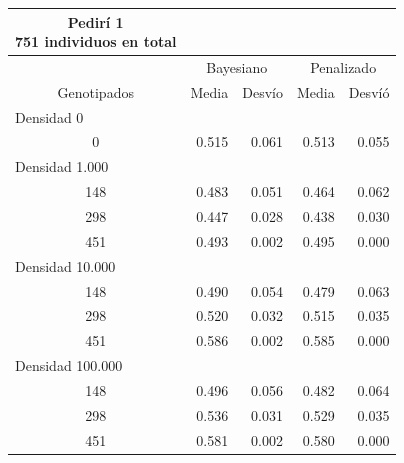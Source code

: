 \documentclass[11pt,spanish,a4paper,oneside,]{book} %
\begin{document}
\captionsetup[table]{labelformat=empty,skip=1pt}
\begin{longtable}{crrrr}
\caption*{
{\large Pedirí 1} \\ 
{\small 751 individuos en total}
} \\ 
\toprule
 & \multicolumn{2}{c}{Bayesiano} & \multicolumn{2}{c}{Penalizado} \\ 
 \cmidrule(lr){2-3} \cmidrule(lr){4-5}
Genotipados & Media & Desvío & Media & Desvíó \\ 
\midrule
\multicolumn{1}{l}{Densidad 0} \\ 
\midrule
0 & 0.515 & 0.061 & 0.513 & 0.055 \\ 
\midrule
\multicolumn{1}{l}{Densidad 1.000} \\ 
\midrule
148 & 0.483 & 0.051 & 0.464 & 0.062 \\ 
298 & 0.447 & 0.028 & 0.438 & 0.030 \\ 
451 & 0.493 & 0.002 & 0.495 & 0.000 \\ 
\midrule
\multicolumn{1}{l}{Densidad 10.000} \\ 
\midrule
148 & 0.490 & 0.054 & 0.479 & 0.063 \\ 
298 & 0.520 & 0.032 & 0.515 & 0.035 \\ 
451 & 0.586 & 0.002 & 0.585 & 0.000 \\ 
\midrule
\multicolumn{1}{l}{Densidad 100.000} \\ 
\midrule
148 & 0.496 & 0.056 & 0.482 & 0.064 \\ 
298 & 0.536 & 0.031 & 0.529 & 0.035 \\ 
451 & 0.581 & 0.002 & 0.580 & 0.000 \\ 
 \bottomrule
\end{longtable}
\captionsetup[table]{labelformat=empty,skip=1pt}
\end{document}
